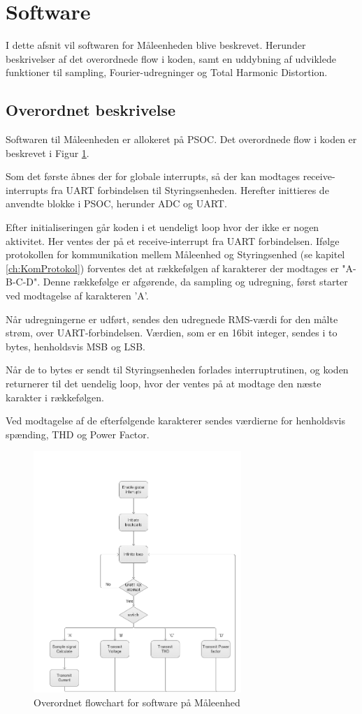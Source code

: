 
\section{Software}

I dette afsnit vil softwaren for Måleenheden blive beskrevet. Herunder beskrivelser af det overordnede flow i koden, samt en uddybning af udviklede funktioner til sampling, Fourier-udregninger og Total Harmonic Distortion. 

\subsection{Overordnet beskrivelse}

Softwaren til Måleenheden er allokeret på PSOC. Det overordnede flow i koden er beskrevet i Figur \ref{fig:MEflowchart}. 

Som det første åbnes der for globale interrupts, så der kan modtages receive-interrupts fra UART forbindelsen til Styringsenheden. Herefter inittieres de anvendte blokke i PSOC, herunder ADC og UART. 

Efter initialiseringen går koden i et uendeligt loop hvor der ikke er nogen aktivitet.  Her ventes der på et receive-interrupt fra UART forbindelsen. Ifølge protokollen for kommunikation mellem Måleenhed og Styringsenhed (se kapitel \ref{ch:KomProtokol}) forventes det at rækkefølgen af karakterer der modtages er "A-B-C-D". Denne rækkefølge er afgørende, da sampling og udregning, først starter ved modtagelse af karakteren 'A'. 

Når udregningerne er udført, sendes den udregnede RMS-værdi for den målte strøm, over UART-forbindelsen. Værdien, som er en 16bit integer, sendes i to bytes, henholdsvis MSB og LSB. 

Når de to bytes er sendt til Styringsenheden forlades interruptrutinen, og koden returnerer til det uendelig loop, hvor der ventes på at modtage den næste karakter i rækkefølgen. 

Ved modtagelse af de efterfølgende karakterer sendes værdierne for henholdsvis spænding, THD og Power Factor. 


\begin{figure}[H] %
	\centering
	\includegraphics[width=0.7\textwidth]{Figure/MEflowchart.png}
	\caption{Overordnet flowchart for software på Måleenhed}
	\label{fig:MEflowchart}
\end{figure}

